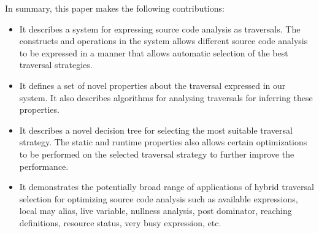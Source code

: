 In summary, this paper makes the following contributions:
\begin{itemize}
  \item It describes a system for expressing source code analysis as traversals. The
  constructs and operations in the system allows different source code analysis to
  be expressed in a manner that allows automatic selection of the best traversal
  strategies.
  \item It defines a set of novel properties about the traversal expressed 
  in our system. It also describes algorithms for analysing traversals for inferring 
  these properties. 
  \item It describes a novel decision tree for selecting the most suitable traversal 
  strategy. The static and runtime properties also allows
  certain optimizations to be performed on the selected traversal strategy to
  further improve the performance.
  \item It demonstrates the potentially broad range of applications of
  hybrid traversal selection for optimizing source code analysis such
  as available expressions, local may alias, live variable, nullness
  analysis, post dominator, reaching definitions, resource status,
  very busy expression, etc.
\end{itemize}